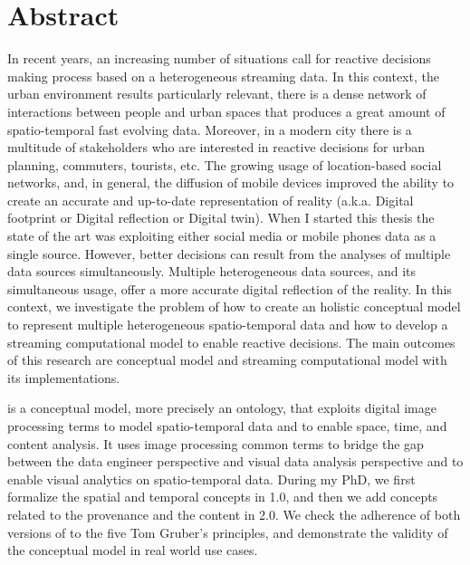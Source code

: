 \chapter*{Abstract}

In recent years, an increasing number of situations call for reactive decisions making process based on a heterogeneous streaming data.
In this context, the urban environment results particularly relevant, there is a dense network of interactions between people and urban spaces that produces a great amount of spatio-temporal fast evolving data. Moreover, in a modern city there is a multitude of stakeholders who are interested in reactive decisions for urban planning, commuters, tourists, etc.
The growing usage of location-based social networks, and, in general, the diffusion of mobile devices improved the ability to create an accurate and up-to-date representation of reality (a.k.a. Digital footprint or Digital reflection or Digital twin).
When I started this thesis the state of the art was exploiting either social media or mobile phones data as a single source.
However, better decisions can result from the analyses of multiple data sources simultaneously.
Multiple heterogeneous data sources, and its simultaneous usage, offer a more accurate digital reflection of the reality.
In this context, we investigate the problem of how to create an holistic conceptual model to represent multiple heterogeneous spatio-temporal data and how to develop a streaming computational model to enable reactive decisions.
The main outcomes of this research are \frappe{} conceptual model and \river{} streaming computational model with its implementations.

\frappe{} is a conceptual model, more precisely an ontology, that exploits digital image processing terms to model spatio-temporal data and to enable space, time, and content analysis.
It uses image processing common terms to bridge the gap between the data engineer perspective and visual data analysis perspective and to enable visual analytics on spatio-temporal data.
During my PhD, we first formalize the spatial and temporal concepts in \frappe{} 1.0, and then we add concepts related to the provenance and the content in \frappe{} 2.0.
We check the adherence of both versions of \frappe{} to the five Tom Gruber's principles, and demonstrate the validity of the conceptual model in real world use cases.

